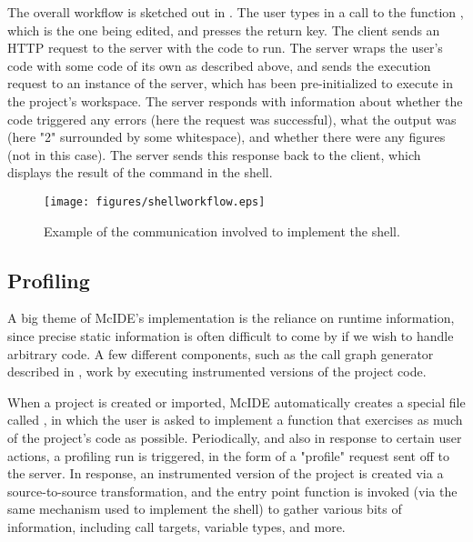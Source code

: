 The overall workflow is sketched out in . The user
types in a call to the function , which is the one being edited, and
presses the return key. The client sends an HTTP request to the server with the
code to run. The server wraps the user's code with some code of its own as
described above, and sends the execution request to an instance of the \matlab
server, which has been pre-initialized to execute in the project's workspace.
The \matlab server responds with information about whether the code triggered
any errors (here the request was successful), what the output was (here "2"
surrounded by some whitespace), and whether there were any figures (not in this
case). The server sends this response back to the client, which displays the
result of the command in the shell.

\begin{figure}
\centering
\texttt{[image: figures/shellworkflow.eps]}
\caption{Example of the communication involved to implement the \matlab shell.}
\label{fig:ShellWorkflow}
\end{figure}

\subsection{Profiling}

A big theme of McIDE's implementation is the reliance on runtime information,
since precise static information is often difficult to come by if we wish to
handle arbitrary \matlab code. A few different components, such as the call
graph generator described in , work
by executing instrumented versions of the project code.

When a project is created or imported, McIDE automatically creates a special
file called , in which the user is asked to implement
a function that exercises as much of the project's code as possible.
Periodically, and also in response to certain user actions, a profiling run is
triggered, in the form of a "profile" request sent off to the server. In
response, an instrumented version of the project is created via a
source-to-source transformation, and the entry point function is invoked (via
the same mechanism used to implement the \matlab shell) to gather various bits
of information, including call targets, variable types, and more.
